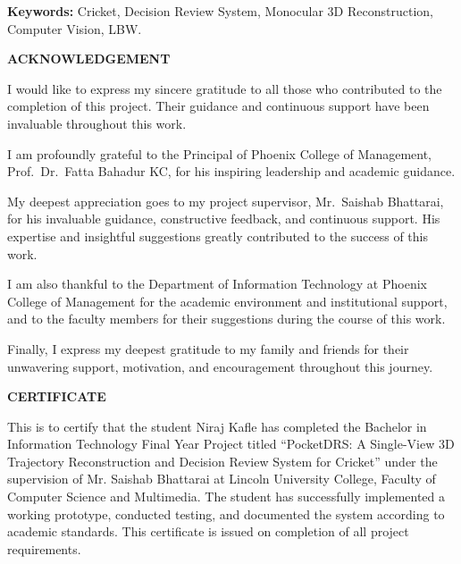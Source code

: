 \documentclass[12pt,a4paper]{report}
\begin{document}
\vspace{1cm}

\noindent
\textbf{Keywords:} Cricket, Decision Review System, Monocular 3D Reconstruction, Computer Vision, LBW.

\clearpage

\begin{center}\textbf{\fontsize{16}{19}\selectfont ACKNOWLEDGEMENT}\end{center}
\vspace{0.5cm}

I would like to express my sincere gratitude to all those who contributed to the completion of this project. Their guidance and continuous support have been invaluable throughout this work.

I am profoundly grateful to the Principal of Phoenix College of Management, Prof.~Dr.~Fatta Bahadur KC, for his inspiring leadership and academic guidance.

My deepest appreciation goes to my project supervisor, Mr.~Saishab Bhattarai, for his invaluable guidance, constructive feedback, and continuous support. His expertise and insightful suggestions greatly contributed to the success of this work.

I am also thankful to the Department of Information Technology at Phoenix College of Management for the academic environment and institutional support, and to the faculty members for their suggestions during the course of this work.

Finally, I express my deepest gratitude to my family and friends for their unwavering support, motivation, and encouragement throughout this journey.

\clearpage

\begin{center}\textbf{\fontsize{16}{19}\selectfont CERTIFICATE}\end{center}
\vspace{0.5cm}

This is to certify that the student Niraj Kafle has completed the Bachelor in Information Technology Final Year Project titled ``PocketDRS: A Single-View 3D Trajectory Reconstruction and Decision Review System for Cricket'' under the supervision of Mr. Saishab Bhattarai at Lincoln University College, Faculty of Computer Science and Multimedia. The student has successfully implemented a working prototype, conducted testing, and documented the system according to academic standards. This certificate is issued on completion of all project requirements.
\end{document}
